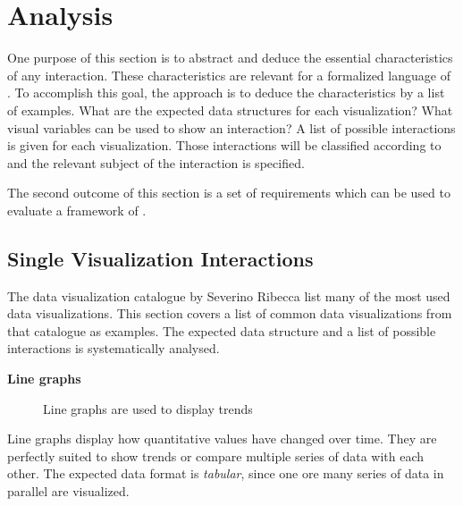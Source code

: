 \chapter{Analysis}\label{sec:analysis}
One purpose of this section is to abstract and deduce the essential characteristics of any interaction.
These characteristics are relevant for a formalized language of \cmvs{}.
To accomplish this goal, the approach is to deduce the characteristics by a list of examples.
What are the expected data structures for each visualization?
What visual variables can be used to show an interaction?
A list of possible interactions is given for each visualization.
Those interactions will be classified according to \textcite{Yi2007} and the relevant subject of the interaction is specified.

The second outcome of this section is a set of requirements which can be used to evaluate a framework of \cmvs{}.


\section{Single Visualization Interactions}\label{sec:analysis:examples:single}

The data visualization catalogue by Severino Ribecca list many of the most used data visualizations\cite{VisualizationCatalogue2017}.
This section covers a list of common data visualizations from that catalogue as examples.
The expected data structure and a list of possible interactions is systematically analysed.

\textbf{Line graphs}
\begin{figure}
  \begin{center}
    \qquad
  \end{center}
  \caption{Line graphs are used to display trends}
  \label{fig:analysis:line-graphs}
\end{figure}

Line graphs display how quantitative values have changed over time.
They are perfectly suited to show trends or compare multiple series of data with each other.
The expected data format is \emph{tabular}, since one ore many series of data in parallel are visualized.

